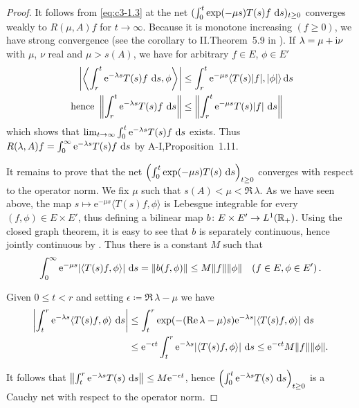 \begin{proof}
	It follows from \eqref{eq:c3-1.3} at the net $(\int_{0}^t \exp(-\mu s)T(s) f \,\mathop{}\!\mathrm{d}{s})_{t\geq 0}$ converges weakly to $R(\mu,A)f$ for $t \to \infty$.
	Because it is monotone increasing $(f \geq 0)$, we have strong convergence (see the corollary to II.Theorem~5.9 in \citet{schaefer:1974}).
%
%
If $\lambda = \mu + \mathrm{i}\nu$ with $\mu$, $\nu$ real and $\mu > s(A)$, we have for arbitrary $f \in E$, $\phi \in E'$
\begin{align*}
	\left|\left\langle \int_{r}^t \mathrm{e}^{-\lambda s}T(s)f \,\mathop{}\!\mathrm{d}{s},\phi\right\rangle\right| &\leq \int_{r}^t \mathrm{e}^{-\mu s}\langle T(s)|f|,|\phi|\rangle\mathop{}\!\mathrm{d}{s} \\
	\text{ hence } \left\|\int_{r}^t \mathrm{e}^{-\lambda s}T(s)f \,\mathop{}\!\mathrm{d}{s}\right\| &\leq \left\|\int_{r}^t \mathrm{e}^{-\mu s}T(s)|f| \,\mathop{}\!\mathrm{d}{s}\right\| \
\end{align*}
which shows that $\lim_{t\to\infty} \int_{0}^t \mathrm{e}^{-\lambda s}T(s)f \,\mathop{}\!\mathrm{d}{s}$ exists.
Thus $R(\lambda,A)f = \int_{0}^{\infty} \mathrm{e}^{-\lambda s} T(s)f \,\mathop{}\!\mathrm{d}{s}$ by A-I,Proposition~1.11.

It remains to prove that the net $\left(\int_{0}^t \exp(-\mu s)T(s) \,\mathop{}\!\mathrm{d}{s}\right)_{t\geq 0}$ converges with respect to the operator norm.
We fix $\mu$ such that $s(A) < \mu < \Re\, \lambda$.
As we have seen above, the map $s \mapsto \mathrm{e}^{-\mu s}\langle T(s)f,\phi\rangle$ is Lebesgue integrable for every $(f,\phi) \in E \times E'$, thus defining a bilinear map $b \colon E \times E' \to L^1(\mathbb{R} _{+})$.
Using the closed graph theorem, it is easy to see that $b$ is separately continuous, hence jointly continuous by \citet[III.Theorem~5.1]{schaefer:1966}.
Thus there is a constant $M$ such that
\begin{equation}\label{eq:c3-1.4}
	\int_{0}^{\infty} \mathrm{e}^{-\mu s}|\langle T(s)f,\phi\rangle| \,\mathop{}\!\mathrm{d}{s} = \|b(f,\phi)\| \leq M\|f\|\|\phi\| \quad (f \in E, \phi \in E')\,.
\end{equation}

Given $0 \leq t < r$ and setting $\epsilon \coloneqq \Re\, \lambda - \mu$ we have
\begin{align*}
	\left|\int_{t}^r \mathrm{e}^{-\lambda s}\langle T(s)f,\phi\rangle \,\mathop{}\!\mathrm{d}{s}\right| &\leq \int_{t}^r \exp(-(\mathop{}\!\mathrm{Re}\,\lambda-\mu)s)\mathrm{e}^{-\lambda s}|\langle T(s)f,\phi\rangle| \,\mathop{}\!\mathrm{d}{s} \\
	&\leq \mathrm{e}^{-\epsilon t}\int_{t}^r \mathrm{e}^{-\lambda s}|\langle T(s)f,\phi\rangle| \,\mathop{}\!\mathrm{d}{s} \leq \mathrm{e}^{-\epsilon t} M\|f\|\|\phi\|.
\end{align*}

It follows that $\left\|\int_{t}^r \mathrm{e}^{-\lambda s}T(s) \,\mathop{}\!\mathrm{d}{s}\right\| \leq M\mathrm{e}^{-\epsilon t}$, hence $\left(\int_{0}^t \mathrm{e}^{-\lambda s}T(s) \,\mathop{}\!\mathrm{d}{s}\right)_{t\geq 0}$ is a Cauchy net with respect to the operator norm.
\end{proof}

